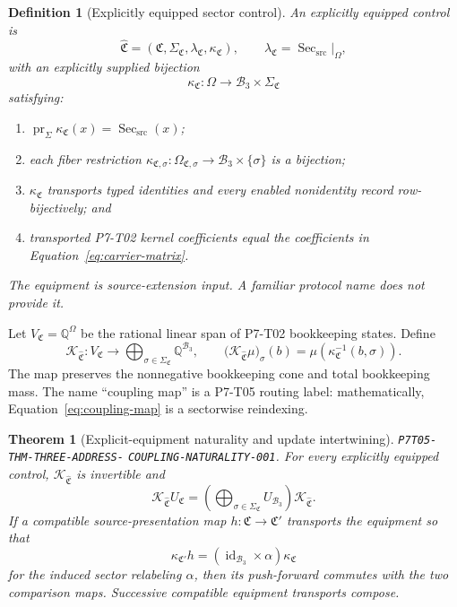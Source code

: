 \documentclass[11pt]{article}
\newtheorem{definition}{Definition}
\newtheorem{theorem}{Theorem}
\newcommand{\Sec}{\operatorname{Sec}_{\mathrm{src}}}
\newcommand{\Control}{\mathfrak C}
\newcommand{\Carrier}{\mathcal B_3}
\newcommand{\Kmap}{\mathcal K}
\newcommand{\Update}{U}
\newcommand{\Q}{\mathbb Q}
\begin{document}
\begin{definition}[Explicitly equipped sector control]
An explicitly equipped control is
\[
 \widehat{\Control}
 =(\Control,\Sigma_{\Control},\lambda_{\Control},\kappa_{\Control}),
 \qquad
 \lambda_{\Control}=\Sec|_{\Omega},
\]
with an \emph{explicitly supplied} bijection
\[
 \kappa_{\Control}:\Omega\longrightarrow
 \Carrier\times\Sigma_{\Control}
\]
satisfying:
\begin{enumerate}[leftmargin=*]
\item
 \(\operatorname{pr}_{\Sigma}\kappa_{\Control}(x)=\Sec(x)\);
\item each fiber restriction
 \(\kappa_{\Control,\sigma}:\Omega_{\Control,\sigma}
   \to\Carrier\times\{\sigma\}\)
 is a bijection;
\item \(\kappa_{\Control}\) transports typed identities and every enabled
 nonidentity record row-bijectively; and
\item transported P7-T02 kernel coefficients equal the coefficients in
 Equation~\eqref{eq:carrier-matrix}.
\end{enumerate}
The equipment is source-extension input.  A familiar protocol name does
not provide it.
\end{definition}

Let \(V_{\Control}=\Q^\Omega\) be the rational linear span of P7-T02
bookkeeping states.  Define
\begin{equation}
 \Kmap_{\widehat{\Control}}:
 V_{\Control}\longrightarrow
 \bigoplus_{\sigma\in\Sigma_{\Control}}\Q^{\Carrier},
 \qquad
 \bigl(\Kmap_{\widehat{\Control}}\mu\bigr)_\sigma(b)
 =
 \mu\!\left(\kappa_{\Control}^{-1}(b,\sigma)\right).
 \label{eq:coupling-map}
\end{equation}
The map preserves the nonnegative bookkeeping cone and total bookkeeping
mass.  The name ``coupling map'' is a P7-T05 routing label: mathematically,
Equation~\eqref{eq:coupling-map} is a sectorwise reindexing.

\begin{theorem}[Explicit-equipment naturality and update intertwining]
\label{thm:intertwining}
\textup{\texttt{P7T05-THM-THREE-ADDRESS-}\allowbreak
\texttt{COUPLING-NATURALITY-001}.}
For every explicitly equipped control,
\(\Kmap_{\widehat{\Control}}\) is invertible and
\begin{equation}
 \Kmap_{\widehat{\Control}}\Update_{\Control}
 =
 \left(\bigoplus_{\sigma\in\Sigma_{\Control}}\Update_{\Carrier}\right)
 \Kmap_{\widehat{\Control}}.
 \label{eq:intertwining}
\end{equation}
If a compatible source-presentation map \(h:\Control\to\Control'\)
transports the equipment so that
\[
 \kappa_{\Control'}h
 =
 (\operatorname{id}_{\Carrier}\times\alpha)\kappa_{\Control}
\]
for the induced sector relabeling \(\alpha\), then its push-forward commutes
with the two comparison maps.  Successive compatible equipment transports
compose.
\end{theorem}
\end{document}
